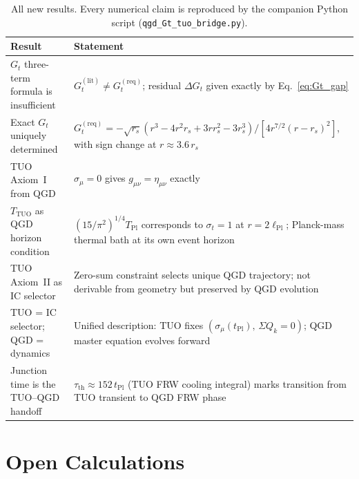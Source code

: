 \documentclass[11pt,a4paper]{article}
\theoremstyle{plain}
\theoremstyle{definition}
\theoremstyle{remark}
\newcommand{\sigt}{\sigma_t}
\newcommand{\rs}{r_s}
\newcommand{\lPl}{\ell_{\mathrm{Pl}}}
\newcommand{\TPl}{T_{\mathrm{Pl}}}
\newcommand{\TTUO}{T_{\mathrm{TUO}}}
\begin{document}
\begin{table}[h]
\centering
\caption{All new results.  Every numerical claim is reproduced by the
companion Python script (\texttt{qgd\_Gt\_tuo\_bridge.py}).}
\label{tab:summary}
\renewcommand{\arraystretch}{1.45}
\begin{tabular}{p{5.5cm}p{7cm}}
\toprule
Result & Statement \\
\midrule
\rowcolor{lightgray}
$G_t$ three-term formula is insufficient &
$G_t^{(\mathrm{lit})} \ne G_t^{(\mathrm{req})}$; residual $\Delta G_t$
given exactly by Eq.~\eqref{eq:Gt_gap} \\

Exact $G_t$ uniquely determined &
$G_t^{(\mathrm{req})} = -\sqrt{\rs}(r^3-4r^2\rs+3r\rs^2-3\rs^3)/
[4r^{7/2}(r-\rs)^2]$, with sign change at $r \approx 3.6\,\rs$ \\

\rowcolor{lightgray}
TUO Axiom~I from QGD &
$\sigma_\mu = 0$ gives $g_{\mu\nu} = \eta_{\mu\nu}$ exactly \\

$\TTUO$ as QGD horizon condition &
$(15/\pi^2)^{1/4}\TPl$ corresponds to $\sigt = 1$ at $r = 2\lPl$;
Planck-mass thermal bath at its own event horizon \\

\rowcolor{lightgray}
TUO Axiom~II as IC selector &
Zero-sum constraint selects unique QGD trajectory; not derivable from
geometry but preserved by QGD evolution \\

TUO = IC selector; QGD = dynamics &
Unified description: TUO fixes $(\sigma_\mu(t_\mathrm{Pl}),\, \Sigma Q_k=0)$;
QGD master equation evolves forward \\

\rowcolor{lightgray}
Junction time is the TUO--QGD handoff &
$\tau_\mathrm{th} \approx 152\,t_\mathrm{Pl}$ (TUO FRW cooling integral)
marks transition from TUO transient to QGD FRW phase \\
\bottomrule
\end{tabular}
\end{table}

\section{Open Calculations}
\end{document}
